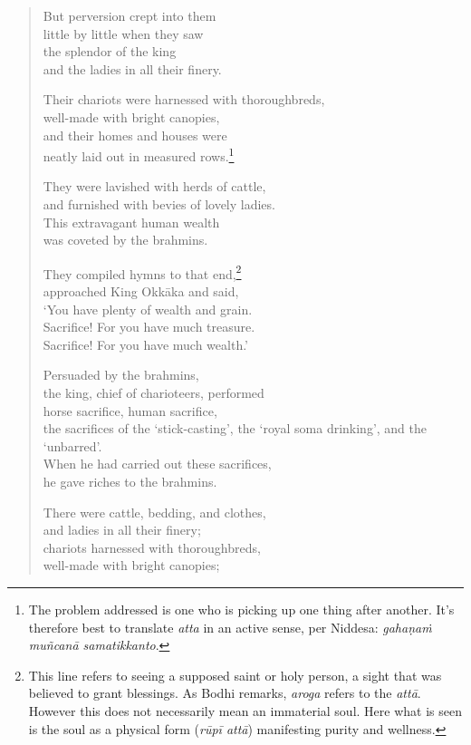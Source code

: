 \documentclass[12pt,openany]{book}%
\begin{document}
\begin{verse}
But perversion crept into them \\
little by little when they saw \\
the splendor of the king \\
and the ladies in all their finery. 

Their chariots were harnessed with thoroughbreds, \\
well-made with bright canopies, \\
and their homes and houses were \\
neatly laid out in measured rows.\footnote{The problem addressed is one who is picking up one thing after another. It’s therefore best to translate \textit{atta} in an active sense, per Niddesa: \textit{\textsanskrit{gahaṇaṁ} \textsanskrit{muñcanā} samatikkanto}. } 

They were lavished with herds of cattle, \\
and furnished with bevies of lovely ladies. \\
This extravagant human wealth \\
was coveted by the brahmins. 

They compiled hymns to that end,\footnote{This line refers to seeing a supposed saint or holy person, a sight that was believed to grant blessings. As Bodhi remarks, \textit{aroga} refers to the \textit{\textsanskrit{attā}}. However this does not necessarily mean an immaterial soul. Here what is seen is the soul as a physical form (\textit{\textsanskrit{rūpī} \textsanskrit{attā}}) manifesting purity and wellness. } \\
approached King \textsanskrit{Okkāka} and said, \\
‘You have plenty of wealth and grain. \\
Sacrifice! For you have much treasure. \\
Sacrifice! For you have much wealth.’ 

Persuaded by the brahmins, \\
the king, chief of charioteers, performed \\
horse sacrifice, human sacrifice, \\
the sacrifices of the ‘stick-casting’, the ‘royal soma drinking’, and the ‘unbarred’. \\
When he had carried out these sacrifices, \\
he gave riches to the brahmins. 

There were cattle, bedding, and clothes, \\
and ladies in all their finery; \\
chariots harnessed with thoroughbreds, \\
well-made with bright canopies; 


\end{verse}
\end{document}
